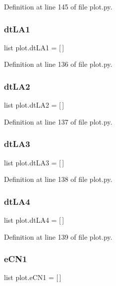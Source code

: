 Definition at line 145 of file plot.\+py.

\mbox{\label{namespaceplot_a482f2d920e4d36d59defc6f61a1fc6dd}} 
\subsubsection{dt\+L\+A1}
{\footnotesize\ttfamily list plot.\+dt\+L\+A1 = [$\,$]}



Definition at line 136 of file plot.\+py.

\mbox{\label{namespaceplot_a21023727ad6875ddcef9146e6fcbbe7b}} 
\subsubsection{dt\+L\+A2}
{\footnotesize\ttfamily list plot.\+dt\+L\+A2 = [$\,$]}



Definition at line 137 of file plot.\+py.

\mbox{\label{namespaceplot_a1fedbc15120f389f0f3ad1ade59ce2af}} 
\subsubsection{dt\+L\+A3}
{\footnotesize\ttfamily list plot.\+dt\+L\+A3 = [$\,$]}



Definition at line 138 of file plot.\+py.

\mbox{\label{namespaceplot_a1da314e1e51a29ff2dba626ad50f3696}} 
\subsubsection{dt\+L\+A4}
{\footnotesize\ttfamily list plot.\+dt\+L\+A4 = [$\,$]}



Definition at line 139 of file plot.\+py.

\mbox{\label{namespaceplot_a9da125d552911aed64523f5650f54fd6}} 
\subsubsection{e\+C\+N1}
{\footnotesize\ttfamily list plot.\+e\+C\+N1 = [$\,$]}



